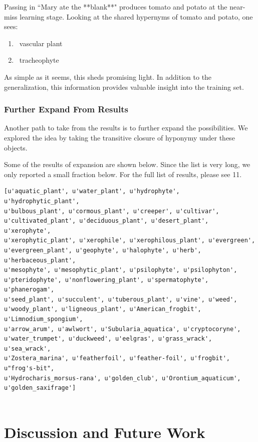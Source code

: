 \documentclass{article}[12pt]
\theoremstyle{definition}
\begin{document}
Passing in ``Mary ate the **blank**" produces tomato and potato at the near-miss learning stage. Looking at the shared hypernyms of tomato and potato, one sees: 

\begin{enumerate}
\item\ vascular plant
\item\ tracheophyte
\end{enumerate}

As simple as it seems, this sheds promising light. In addition to the generalization, this information provides valuable insight into the training set. 

\subsubsection{Further Expand From Results}

Another path to take from the results is to further expand the possibilities. We explored the idea by taking the transitive closure of hyponymy under these objects. 

Some of the results of expansion are shown below. Since the list is very long, we only reported a small fraction below. For the full list of results, please see 11.

\begin{verbatim}
[u'aquatic_plant', u'water_plant', u'hydrophyte', u'hydrophytic_plant',
u'bulbous_plant', u'cormous_plant', u'creeper', u'cultivar', 
u'cultivated_plant', u'deciduous_plant', u'desert_plant', u'xerophyte', 
u'xerophytic_plant', u'xerophile', u'xerophilous_plant', u'evergreen', 
u'evergreen_plant', u'geophyte', u'halophyte', u'herb', u'herbaceous_plant', 
u'mesophyte', u'mesophytic_plant', u'psilophyte', u'psilophyton', 
u'pteridophyte', u'nonflowering_plant', u'spermatophyte', u'phanerogam', 
u'seed_plant', u'succulent', u'tuberous_plant', u'vine', u'weed', 
u'woody_plant', u'ligneous_plant', u'American_frogbit', u'Limnodium_spongium',
u'arrow_arum', u'awlwort', u'Subularia_aquatica', u'cryptocoryne', 
u'water_trumpet', u'duckweed', u'eelgras', u'grass_wrack', u'sea_wrack', 
u'Zostera_marina', u'featherfoil', u'feather-foil', u'frogbit', u"frog's-bit",
u'Hydrocharis_morsus-rana', u'golden_club', u'Orontium_aquaticum', 
u'golden_saxifrage']


\end{verbatim}

\section{Discussion and Future Work}
\end{document}
